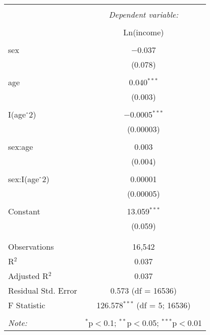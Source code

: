 
\begin{table}[!htbp] \centering 
  \caption{} 
  \label{} 
\begin{tabular}{@{\extracolsep{5pt}}lc} 
\\[-1.8ex]\hline 
\hline \\[-1.8ex] 
 & \multicolumn{1}{c}{\textit{Dependent variable:}} \\ 
\cline{2-2} 
\\[-1.8ex] & Ln(income) \\ 
\hline \\[-1.8ex] 
 sex & $-$0.037 \\ 
  & (0.078) \\ 
  & \\ 
 age & 0.040$^{***}$ \\ 
  & (0.003) \\ 
  & \\ 
 I(age$\hat{\mkern6mu}$2) & $-$0.0005$^{***}$ \\ 
  & (0.00003) \\ 
  & \\ 
 sex:age & 0.003 \\ 
  & (0.004) \\ 
  & \\ 
 sex:I(age$\hat{\mkern6mu}$2) & 0.00001 \\ 
  & (0.00005) \\ 
  & \\ 
 Constant & 13.059$^{***}$ \\ 
  & (0.059) \\ 
  & \\ 
\hline \\[-1.8ex] 
Observations & 16,542 \\ 
R$^{2}$ & 0.037 \\ 
Adjusted R$^{2}$ & 0.037 \\ 
Residual Std. Error & 0.573 (df = 16536) \\ 
F Statistic & 126.578$^{***}$ (df = 5; 16536) \\ 
\hline 
\hline \\[-1.8ex] 
\textit{Note:}  & \multicolumn{1}{r}{$^{*}$p$<$0.1; $^{**}$p$<$0.05; $^{***}$p$<$0.01} \\ 
\end{tabular} 
\end{table} 
